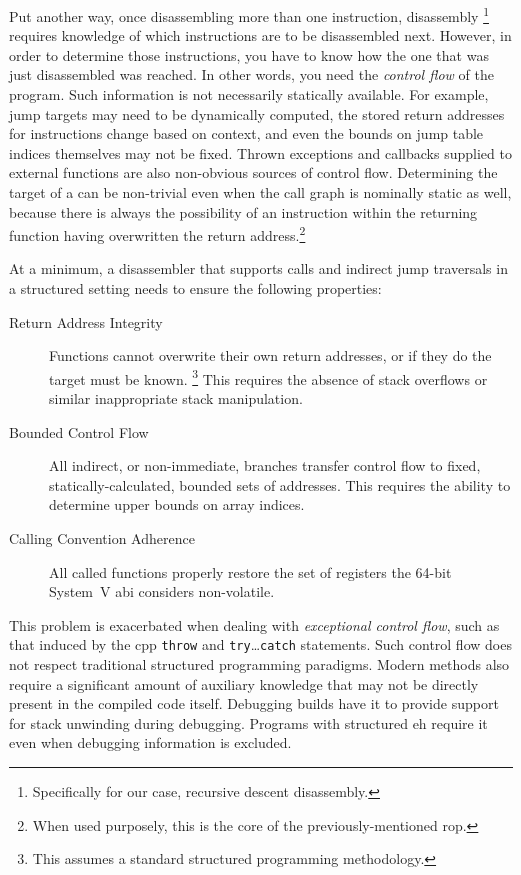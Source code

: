 Put another way, once disassembling more than one instruction, disassembly%
\footnote{Specifically for our case, recursive descent disassembly.}
requires knowledge of which instructions are to be disassembled next.
However, in order to determine those instructions, you have to know how the one that was just disassembled was reached.
In other words, you need the \emph{control flow} of the program.
Such information is not necessarily statically available. For example, jump targets may need to be dynamically computed, the stored return addresses for  instructions change based on context, and even the bounds on jump table indices themselves may not be fixed.
Thrown exceptions and callbacks supplied to external functions are also non-obvious sources of control flow.
Determining the target of a  can be non-trivial even when the call graph is nominally static as well, because there is always the possibility of an instruction within the returning function having overwritten the return address.\footnote{When used purposely, this is the core of the previously-mentioned \ac{rop}.}

At a minimum, a disassembler that supports calls and indirect jump traversals in a structured setting needs to ensure the following properties:
\begin{description}
  \item[Return Address Integrity] Functions cannot overwrite their own return addresses, or if they do the target must be known.%
  \footnote{This assumes a standard structured programming methodology.}
  This requires the absence of stack overflows or similar inappropriate stack manipulation.
  \item[Bounded Control Flow] All indirect, or non-immediate, branches transfer control flow to fixed, statically-calculated, bounded sets of addresses. This requires the ability to determine upper bounds on array indices.
  \item[Calling Convention Adherence] All called functions properly restore the set of registers the 64-bit System~V \ac{abi} considers non-volatile.
\end{description}

This problem is exacerbated when dealing with \emph{exceptional control flow}, such as that induced by the \gls{cpp} \lstinline|throw| and \lstinline|try|\dots\lstinline|catch| statements.
Such control flow does not respect traditional structured programming paradigms.
Modern methods also require a significant amount of auxiliary knowledge that may not be directly present in the compiled code itself.
Debugging builds have it to provide support for stack unwinding during debugging.
Programs with structured \ac{eh} require it even when debugging information is excluded.

